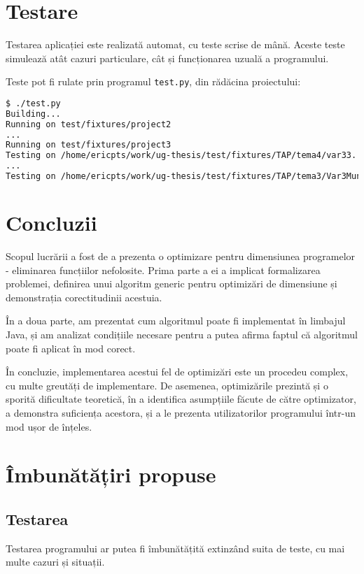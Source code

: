 \section{Testare}

Testarea aplicației este realizată automat, cu teste scrise de mână.
Aceste teste simulează atât cazuri particulare, cât și funcționarea uzuală a
programului.

Teste pot fi rulate prin programul \texttt{test.py}, din rădăcina proiectului:

\begin{lstlisting}[language=Bash]
$ ./test.py
Building...
Running on test/fixtures/project2
...
Running on test/fixtures/project3
Testing on /home/ericpts/work/ug-thesis/test/fixtures/TAP/tema4/var33...
...
Testing on /home/ericpts/work/ug-thesis/test/fixtures/TAP/tema3/Var3Munte...
\end{lstlisting}

\section{Concluzii}

Scopul lucrării a fost de a prezenta o optimizare pentru dimensiunea
programelor - eliminarea funcțiilor nefolosite.
Prima parte a ei a implicat formalizarea problemei, definirea unui algoritm
generic pentru optimizări de dimensiune și demonstrația
corectitudinii acestuia.

În a doua parte, am prezentat cum algoritmul poate fi implementat în limbajul
Java, și am analizat condițiile necesare pentru a putea afirma faptul că
algoritmul poate fi aplicat în mod corect.

În concluzie, implementarea acestui fel de optimizări este un procedeu complex,
cu multe greutăți de implementare.
De asemenea, optimizările prezintă și o sporită dificultate teoretică, în a
identifica asumpțiile făcute de către optimizator, a demonstra suficiența
acestora, și a le prezenta utilizatorilor programului într-un mod ușor de
înțeles.

\section{Îmbunătățiri propuse}

\subsection{Testarea}
Testarea programului ar putea fi îmbunătățită extinzând suita de teste, cu mai
multe cazuri și situații.

